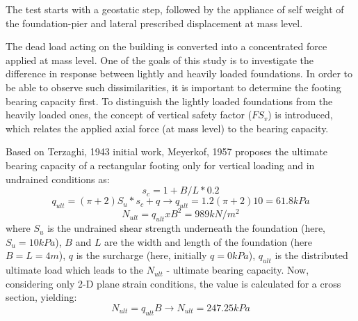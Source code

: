 	The test starts with a geostatic step, followed by the appliance of self weight of the foundation-pier and lateral prescribed displacement at mass level. 
	
	The dead load acting on the building is converted into a concentrated force applied at mass level. One of the goals of this study is to investigate the difference in response between lightly and heavily loaded foundations. In order to be able to observe such dissimilarities, it is important to determine the footing bearing capacity first. To distinguish the lightly loaded foundations from the heavily loaded ones, the concept of vertical safety factor ($FS_v$) is introduced, which relates the applied axial force (at mass level) to the bearing capacity.
	
	Based on Terzaghi, 1943 initial work, Meyerkof, 1957\cite{meyerhof1957ultimate} proposes the ultimate bearing capacity of a rectangular footing only for vertical loading and in undrained conditions as:
	\begin{equation}
		s_c=1+B/L*0.2
	\end{equation}
	\begin{equation}
		q_{ult}=(\pi +2)S_u*s_c + q \longrightarrow q_{ult}=1.2 (\pi+2) 10= 61.8kPa
	\end{equation}
	\begin{equation}
		N_{ult}=q_{ult}xB^2=989 kN/m^2
	\end{equation}
	where $S_u$ is the undrained shear strength underneath the foundation (here, $S_u=10kPa$), $B$ and $L$ are the width and length of the foundation (here $B=L=4m$), $q$ is the surcharge (here, initially $q=0kPa$), $q_{ult}$ is the distributed ultimate load which leads to the $N_{ult}$ - ultimate bearing capacity. Now, considering only 2-D plane strain conditions, the value is calculated for a cross section, yielding:
	\begin{equation}
		N_{ult}=q_{ult} B \longrightarrow N_{ult}=247.25 kPa
	\end{equation}
	
